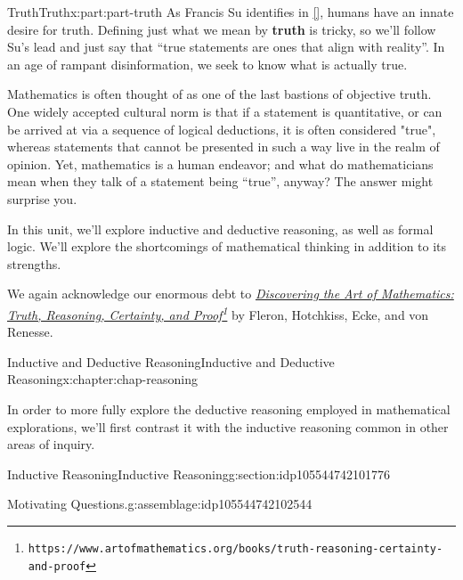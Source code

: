 \documentclass[oneside,10pt,]{book}
\newcommand{\xreffont}{\relax}
\newcommand{\terminology}[1]{\textbf{#1}}
\numberwithin{equation}{section}
\begin{document}
\begin{partptx}{Truth}{}{Truth}{}{}{x:part:part-truth}
 As Francis Su identifies in \hyperlink{x:biblio:Su2020}{[{\xreffont 1}]}, humans have an innate desire for truth. Defining just what we mean by \terminology{truth} is tricky, so we'll follow Su's lead and just say that ``true statements are ones that align with reality''. In an age of rampant disinformation, we seek to know what is actually true.%
\par
Mathematics is often thought of as one of the last bastions of objective truth. One widely accepted cultural norm is that if a statement is quantitative, or can be arrived at via a sequence of logical deductions, it is often considered "true", whereas statements that cannot be presented in such a way live in the realm of opinion. Yet, mathematics is a human endeavor; and what do mathematicians mean when they talk of a statement being ``true'', anyway? The answer might surprise you.%
\par
In this unit, we'll explore inductive and deductive reasoning, as well as formal logic. We'll explore the shortcomings of mathematical thinking in addition to its strengths.%
\par
We again acknowledge our enormous debt to \emph{\href{https://www.artofmathematics.org/books/truth-reasoning-certainty-and-proof}{Discovering the Art of Mathematics: Truth, Reasoning, Certainty, and Proof}\footnote{\nolinkurl{https://www.artofmathematics.org/books/truth-reasoning-certainty-and-proof}\label{g:fn:idp105544742099984}}} by Fleron, Hotchkiss, Ecke, and von Renesse.%
%
\typeout{************************************************}
\typeout{************************************************}
%
\begin{chapterptx}{Inductive and Deductive Reasoning}{}{Inductive and Deductive Reasoning}{}{}{x:chapter:chap-reasoning}
\begin{introduction}{}%
In order to  more fully explore the deductive reasoning employed in mathematical explorations, we'll first contrast it with the inductive reasoning common in other areas of inquiry.%
\end{introduction}%
%
%
\typeout{************************************************}
\typeout{************************************************}
%
\begin{sectionptx}{Inductive Reasoning}{}{Inductive Reasoning}{}{}{g:section:idp105544742101776}
\begin{assemblage}{Motivating Questions.}{g:assemblage:idp105544742102544}%

\end{assemblage}
\end{sectionptx}
\end{chapterptx}
\end{partptx}
\end{document}
